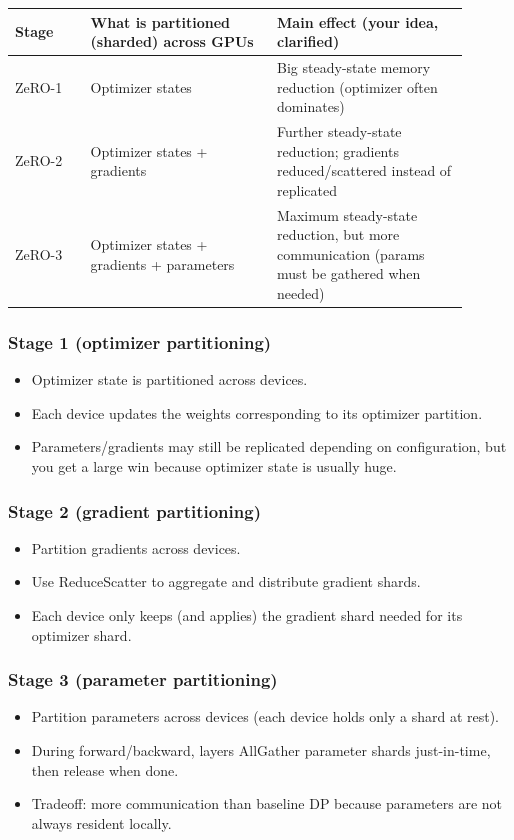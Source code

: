 \documentclass[11pt]{article}
\newcommand{\blue}[1]{\textcolor{myblue}{#1}}
\newcommand{\red}[1]{\textcolor{myred}{#1}}
\begin{document}
\begin{center}
\renewcommand{\arraystretch}{1.15}
\begin{tabular}{|p{0.15\linewidth}|p{0.37\linewidth}|p{0.38\linewidth}|}
\hline
\textbf{Stage} & \textbf{What is partitioned (sharded) across GPUs} & \textbf{Main effect (your idea, clarified)} \\
\hline
ZeRO-1 & Optimizer states & Big steady-state memory reduction (optimizer often dominates) \\
\hline
ZeRO-2 & Optimizer states + gradients & Further steady-state reduction; gradients reduced/scattered instead of replicated \\
\hline
ZeRO-3 & Optimizer states + gradients + parameters & Maximum steady-state reduction, but \red{more communication} (params must be gathered when needed) \\
\hline
\end{tabular}
\end{center}

\subsubsection*{\blue{Stage 1 (optimizer partitioning)}}
\begin{itemize}[leftmargin=1.2em]
\item Optimizer state is partitioned across devices.
\item Each device updates the weights corresponding to its optimizer partition.
\item Parameters/gradients may still be replicated depending on configuration, but you get a large win because optimizer
state is usually huge.
\end{itemize}

\subsubsection*{\blue{Stage 2 (gradient partitioning) }}
\begin{itemize}[leftmargin=1.2em]
\item Partition gradients across devices.
\item Use \blue{ReduceScatter} to aggregate and distribute gradient shards.
\item Each device only keeps (and applies) the gradient shard needed for its optimizer shard.
\end{itemize}

\subsubsection*{\blue{Stage 3 (parameter partitioning)}}
\begin{itemize}[leftmargin=1.2em]
\item Partition parameters across devices (each device holds only a shard at rest).
\item During forward/backward, layers \blue{AllGather} parameter shards just-in-time, then release when done.
\item \red{Tradeoff:} more communication than baseline DP because parameters are not always resident locally.
\end{itemize}
\end{document}
